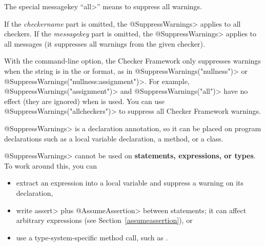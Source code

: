 The special messagekey ``\<all>'' means to suppress all warnings.

If the \emph{checkername} part is omitted, the \<@SuppressWarnings> applies
to all checkers.
If the \emph{messagekey} part is omitted, the \<@SuppressWarnings> applies
to all messages (it suppresses all warnings from the given checker).

With the  command-line
option, the Checker Framework only suppresses warnings when the string is in
the  or 
format, as in
\<@SuppressWarnings("nullness")> or
\<@SuppressWarnings("nullness:assignment")>.
For example, \<@SuppressWarnings("assignment")> and
\<@SuppressWarnings("all")> have no effect (they are ignored) when
 is used.  You can use
\<@SuppressWarnings("allcheckers")> to suppress all Checker Framework
warnings.

%



\<@SuppressWarnings> is a declaration annotation, so it can be placed on
program declarations such as a local variable declaration, a method, or a
class.

\<@SuppressWarnings> cannot be used on \textbf{statements, expressions, or types}.
To work around this, you can
\begin{itemize}
\item
  extract an expression into a local variable
  and suppress a warning on its declaration,
\item
  write \<assert> plus \<@AssumeAssertion> between statements; it can
  affect arbitrary expressions (see Section~\ref{assumeassertion}), or
\item
  use a type-system-specific method call, such as
  .
\end{itemize}

